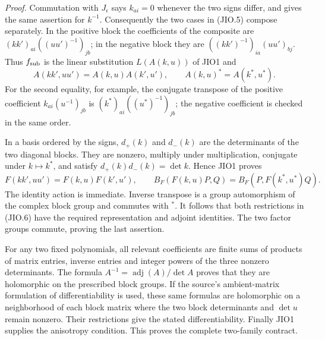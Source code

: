 \emph{Proof.}
Commutation with \(J_\epsilon\) says \(k_{ai}=0\) whenever the
two signs differ, and gives the same assertion for \(k^{-1}\).
Consequently the two cases in (JIO.5) compose separately.
In the positive block the coefficients of the composite are
\((kk')_{ai}((uu')^{-1})_{jb}\); in the negative block they are
\(((kk')^{-1})_{ia}(uu')_{bj}\).  Thus \(f_{\rm sub}\) is the
linear substitution \(L(A(k,u))\) of JIO1 and
\[
 A(kk',uu')=A(k,u)A(k',u'),\qquad
 A(k,u)^*=A(k^*,u^*).
 \tag{JIO.7}
\]
For the second equality, for example, the conjugate transpose of
the positive coefficient \(k_{ai}(u^{-1})_{jb}\) is
\((k^*)_{ai}((u^*)^{-1})_{jb}\); the negative coefficient is checked
in the same order.

In a basis ordered by the signs, \(d_+(k)\) and \(d_-(k)\) are the
determinants of the two diagonal blocks.  They are nonzero, multiply
under multiplication, conjugate under \(k\mapsto k^*\), and satisfy
\(d_+(k)d_-(k)=\det k\).  Hence JIO1 proves
\[
 F(kk',uu')=F(k,u)F(k',u'),\qquad
 B_F(F(k,u)P,Q)=B_F(P,F(k^*,u^*)Q).
 \tag{JIO.8}
\]
The identity action is immediate.  Inverse transpose is a group
automorphism of the complex block group and commutes with \(^{*}\).
It follows that both restrictions in (JIO.6) have the required
representation and adjoint identities.  The two factor groups
commute, proving the last assertion.

For any two fixed polynomials, all relevant coefficients are finite
sums of products of matrix entries, inverse entries and integer
powers of the three nonzero determinants.  The formula
\(A^{-1}=\operatorname{adj}(A)/\det A\) proves that they are
holomorphic on the prescribed block groups.  If the source's
ambient-matrix formulation of differentiability is used, these
same formulas are holomorphic on a neighborhood of each block
matrix where the two block determinants and \(\det u\) remain
nonzero.  Their restrictions give the stated differentiability.
Finally JIO1 supplies the anisotropy condition.  This proves the
complete two-family contract.

